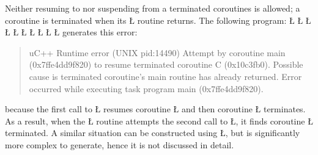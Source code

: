 \documentclass[openright,twoside]{report}
\begin{document}
Neither resuming to nor suspending from a terminated coroutines is allowed;
a coroutine is terminated when its \LGinlinetrue\LGbegin\lgrinde\L{}\endlgrinde\LGend{} routine returns.
The following program:
\LGinlinefalse\LGbegin\lgrinde
\L{}
\L{\LB{}}
\L{}
\L{\LB{}}
\L{\LB{\};}}
\L{}
\L{\LB{}}
\L{\LB{}}
\CE{}\L{\LB{}}
\CE{}\L{\LB{\}}}
\endlgrinde\LGend
generates this error:
\begin{quote}
\BGfont
uC++ Runtime error (UNIX pid:14490) Attempt by coroutine main (0x7ffe4dd9f820) to resume terminated coroutine C (0x10c3fb0).
Possible cause is terminated coroutine's main routine has already returned.
Error occurred while executing task program main (0x7ffe4dd9f820).
\end{quote}
because the first call to \LGinlinetrue\LGbegin\lgrinde\L{}\endlgrinde\LGend{} resumes coroutine \LGinlinetrue\LGbegin\lgrinde\L{}\endlgrinde\LGend{} and then coroutine \LGinlinetrue\LGbegin\lgrinde\L{}\endlgrinde\LGend{} terminates.
As a result, when the \LGinlinetrue\LGbegin\lgrinde\L{}\endlgrinde\LGend{} routine attempts the second call to \LGinlinetrue\LGbegin\lgrinde\L{}\endlgrinde\LGend{}, it finds coroutine \LGinlinetrue\LGbegin\lgrinde\L{}\endlgrinde\LGend{} terminated.
A similar situation can be constructed using \LGinlinetrue\LGbegin\lgrinde\L{}\endlgrinde\LGend{}, but is significantly more complex to generate, hence it is not discussed in detail.
\end{document}
